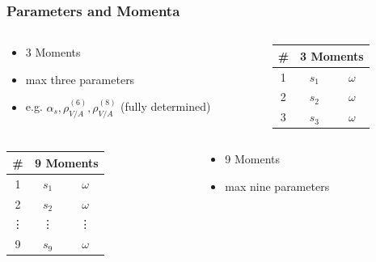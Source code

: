 \documentclass{beamer}
\begin{document}
\begin{frame}
  \frametitle{Parameters and Momenta}
  \begin{columns}
    \begin{column}{.6\textwidth}
      \begin{itemize}
        \item 3 Moments
        \item max three parameters
        \item e.g. \(\alpha_s, \rho_{V/A}^{(6)}, \rho_{V/A}^{(8)}\) (fully determined)
      \end{itemize}
    \end{column}
    \begin{column}{.4\textwidth}
      \begin{tabular}{ccc}
        \toprule
        \# &\multicolumn{2}{c}{3 Moments} \\
        \midrule
        1 & \(s_1\) & \(\omega\) \\
        2 & \(s_2\) & \(\omega\) \\
        3 & \(s_3\) & \(\omega\) \\
        \bottomrule
      \end{tabular}
    \end{column}
  \end{columns}

  \vfill

  \begin{columns}
    \begin{column}{.4\textwidth}
      \centering
      \begin{tabular}{ccc}
        \toprule
        \# &\multicolumn{2}{c}{9 Moments} \\
        \midrule
        1      & \(s_1\) & \(\omega\) \\
        2      & \(s_2\) & \(\omega\) \\
        \vdots & \vdots  & \vdots     \\
        9      & \(s_9\) & \(\omega\) \\
        \bottomrule
      \end{tabular}
    \end{column}
    \begin{column}{.6\textwidth}
      \begin{itemize}
      \item 9 Moments
      \item max nine parameters
      \end{itemize}
    \end{column}
  \end{columns}
\end{frame}
\end{document}
